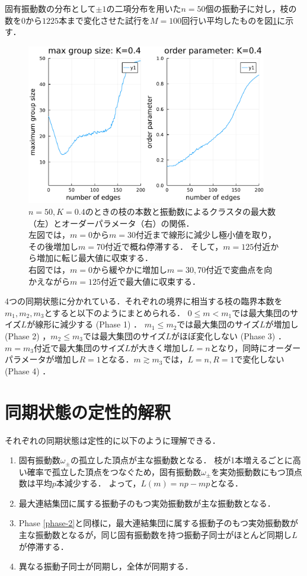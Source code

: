 \documentclass[../main]{subfiles}
\begin{document}
固有振動数の分布として$\pm 1$の二項分布を用いた$n=50$個の振動子に対し，枝の数を$0$から$1225$本まで変化させた試行を$M=100$回行い平均したものを図\ref{fig:edge-strict400}に示す．
\begin{figure}[H]
\centering
\includegraphics[width=105mm]{images/edge-finite-strict400.pdf}
\centering
\caption{$n=50,K=0.4$のときの枝の本数と振動数によるクラスタの最大数（左）とオーダーパラメータ（右）の関係．\\
左図では，$m=0$から$m=30$付近まで線形に減少し極小値を取り，その後増加し$m=70$付近で概ね停滞する．
そして，$m=125$付近から増加に転じ最大値に収束する．\\
右図では，$m=0$から緩やかに増加し$m=30,70$付近で変曲点を向かえながら$m=125$付近で最大値に収束する．
}
\label{fig:edge-strict400}
\end{figure}
4つの同期状態に分かれている．それぞれの境界に相当する枝の臨界本数を$m_1,m_2,m_3$とすると以下のようにまとめられる．
$0\leq m<m_1$では最大集団のサイズ$L$が線形に減少する (Phase 1) ．
$m_1\leq m_2$では最大集団のサイズ$L$が増加し (Phase 2) ，$m_2\leq m_3$では最大集団のサイズ$L$がほぼ変化しない (Phase 3) ．
$m=m_3$付近で最大集団のサイズ$L$が大きく増加し$L=n$となり，同時にオーダーパラメータが増加し$R=1$となる．$m\gtrsim m_3$では，$L=n,R=1$で変化しない (Phase 4) ．
\section{同期状態の定性的解釈}
それぞれの同期状態は定性的に以下のように理解できる．
\renewcommand{\labelenumi}{Phase \theenumi}
\begin{enumerate}
    \item 固有振動数$\omega_\pm$の孤立した頂点が主な振動数となる．
    枝が1本増えるごとに高い確率で孤立した頂点をつなぐため，固有振動数$\omega_\pm$を実効振動数にもつ頂点数は平均$p$本減少する．
    よって，$L(m)=np-mp$となる．
    \item \label{phase-2}最大連結集団に属する振動子のもつ実効振動数が主な振動数となる．
    \item Phase \ref{phase-2}と同様に，最大連結集団に属する振動子のもつ実効振動数が主な振動数となるが，同じ固有振動数を持つ振動子同士がほとんど同期し$L$が停滞する．
    \item 異なる振動子同士が同期し，全体が同期する．
\end{enumerate}
\end{document}
